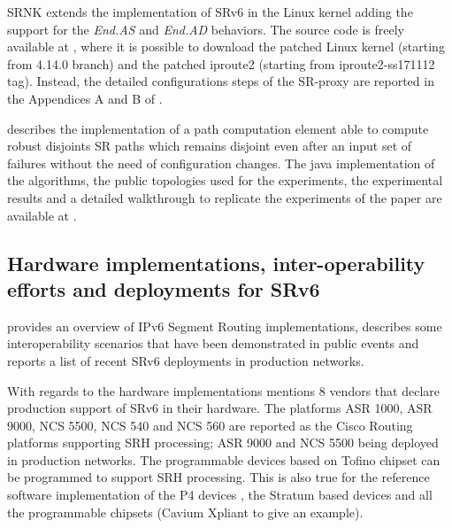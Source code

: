 SRNK \cite{mayer2019efficient} extends the implementation of SRv6 in the Linux kernel \cite{lebrun2017implementing} adding the support for the \textit{End.AS} and \textit{End.AD} behaviors. The source code is freely available at \cite{srnk-home}, where it is possible to download the patched Linux kernel (starting from 4.14.0 branch) and the patched iproute2 (starting from iproute2-ss171112 tag). Instead, the detailed configurations steps of the SR-proxy are reported in the Appendices A and B of \cite{mayer2019efficient}.

\cite{aubry2018robustly} describes the implementation of a path computation element able to compute robust disjoints SR paths which remains disjoint even after an input set of failures without the need of configuration changes. The java implementation of the algorithms, the public topologies used for the experiments, the experimental results and a detailed walkthrough to replicate the experiments of the paper are available at \cite{robustly-home}.

\subsection{Hardware implementations, inter-operability efforts and deployments for SRv6}
\label{sec:hw_interop}

\cite{matsushima-spring-srv6-deployment} provides an overview of IPv6 Segment Routing implementations, describes some interoperability scenarios that have been demonstrated in public events and reports a list of recent SRv6 deployments in production networks.


With regards to the hardware implementations  \cite{matsushima-spring-srv6-deployment} mentions 8 vendors that declare production support of SRv6 in their hardware. The platforms ASR 1000, ASR 9000, NCS 5500, NCS 540 and NCS 560 are reported as the Cisco Routing platforms supporting SRH processing; ASR 9000 and NCS 5500 being deployed in production networks.  The programmable devices based on Tofino chipset \cite{barefoot} can be programmed to support SRH processing. This is also true for the reference software implementation of the P4 devices \cite{bmv2}, the Stratum based devices \cite{stratum} and all the programmable chipsets (Cavium Xpliant \cite{cavium} to give an example).  

